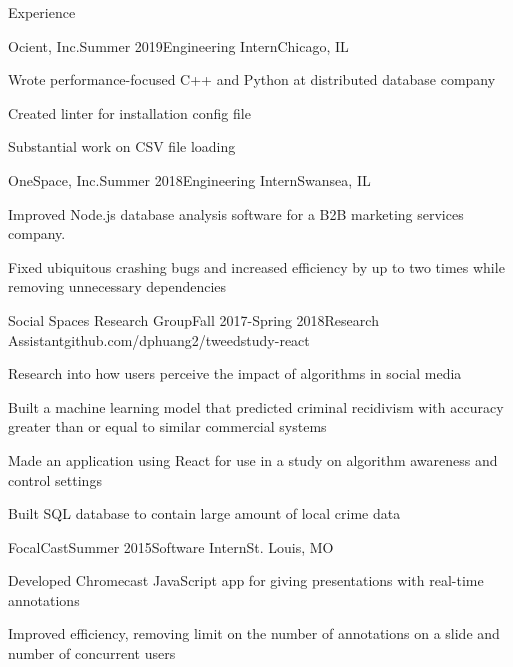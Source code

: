 \documentclass{resume} %
\begin{document}
            \begin{rSection}{Experience}
                \begin{rSubsection}{Ocient, Inc.}{Summer 2019}{Engineering Intern}{Chicago, IL} 
                \item Wrote performance-focused C++ and Python at distributed database company
                \item Created linter for installation config file
                \item Substantial work on CSV file loading
                \end{rSubsection}

                \begin{rSubsection}{OneSpace, Inc.}{Summer 2018}{Engineering Intern}{Swansea, IL} 
                \item Improved Node.js database analysis software for a B2B marketing services company. 
                \item Fixed ubiquitous crashing bugs and increased efficiency by up to two times while removing unnecessary dependencies
                \end{rSubsection}

                \begin{rSubsection}{Social Spaces Research Group}{Fall 2017-Spring 2018}{Research Assistant}{github.com/dphuang2/tweedstudy-react}{}
                \item Research into how users perceive the impact of algorithms in social media
                \item Built a machine learning model that predicted criminal recidivism with accuracy greater than or equal to similar commercial systems
                \item Made an application using React for use in a study on algorithm awareness and control settings
                \item Built SQL database to contain large amount of local crime data
                \end{rSubsection}

                \begin{rSubsection}{FocalCast}{Summer 2015}{Software Intern}{St. Louis, MO}{}
                \item Developed Chromecast JavaScript app for giving presentations with real-time annotations
                \item Improved efficiency, removing limit on the number of annotations on a slide and number of concurrent users
                \end{rSubsection}

            \end{rSection}
\end{document}
